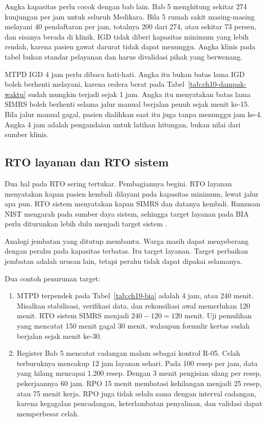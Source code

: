 Angka kapasitas perlu cocok dengan bab lain. Bab 5 menghitung sekitar 274 kunjungan per jam untuk
seluruh Medikara. Bila 5 rumah sakit masing-masing melayani 40 pendaftaran per jam, totalnya 200
dari 274, atau sekitar 73 persen, dan sisanya berada di klinik. IGD tidak diberi kapasitas minimum
yang lebih rendah, karena pasien gawat darurat tidak dapat menunggu. Angka klinis pada tabel bukan
standar pelayanan dan harus divalidasi pihak yang berwenang.

MTPD IGD 4 jam perlu dibaca hati-hati. Angka itu bukan batas lama IGD boleh berhenti melayani,
karena cedera berat pada Tabel~\ref{tab:ch10-dampak-waktu} sudah mungkin terjadi sejak 1 jam.
Angka itu menyatakan batas lama SIMRS boleh berhenti selama jalur manual berjalan penuh sejak menit
ke-15. Bila jalur manual gagal, pasien dialihkan saat itu juga tanpa menunggu jam ke-4. Angka 4 jam
adalah pengandaian untuk latihan hitungan, bukan nilai dari sumber klinis.

\subsection*{RTO layanan dan RTO sistem}

Dua hal pada RTO sering tertukar. Pembagiannya begini. RTO layanan menyatakan kapan pasien kembali
dilayani pada kapasitas minimum, lewat jalur apa pun. RTO sistem menyatakan kapan SIMRS dan datanya
kembali. Rumusan NIST mengarah pada sumber daya sistem, sehingga target layanan pada BIA perlu
diturunkan lebih dulu menjadi target sistem \cite{c10-nist80034}.

Analogi jembatan yang ditutup membantu. Warga masih dapat menyeberang dengan perahu pada kapasitas
terbatas. Itu target layanan. Target perbaikan jembatan adalah urusan lain, tetapi perahu tidak
dapat dipakai selamanya.

Dua contoh penurunan target:
\begin{enumerate}
  \item MTPD terpendek pada Tabel~\ref{tab:ch10-bia} adalah 4 jam, atau 240 menit. Misalkan
  stabilisasi, verifikasi data, dan rekonsiliasi awal memerlukan 120 menit. RTO sistem SIMRS
  menjadi $240 - 120 = 120$ menit. Uji pemulihan yang mencatat 150 menit gagal 30 menit, walaupun
  formulir kertas sudah berjalan sejak menit ke-30.
  \item Register Bab 5 mencatat cadangan malam sebagai kontrol R-05. Celah terburuknya mencakup
  12 jam layanan sehari. Pada 100 resep per jam, data yang hilang mencapai 1.200 resep. Dengan 3
  menit pengisian ulang per resep, pekerjaannya 60 jam. RPO 15 menit membatasi kehilangan menjadi
  25 resep, atau 75 menit kerja. RPO juga tidak selalu sama dengan interval cadangan, karena
  kegagalan pencadangan, keterlambatan penyalinan, dan validasi dapat memperbesar celah.
\end{enumerate}

